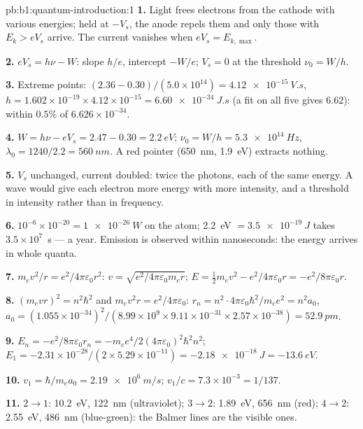 \begin{solution}{pb:b1:quantum-introduction:1}
\textbf{1.} Light frees electrons from the cathode with various
energies; held at $-V_s$, the anode repels them and only those with
$E_k > eV_s$ arrive. The current vanishes when $eV_s = E_{k,\max}$.

\textbf{2.} $eV_s = h\nu - W$: slope $h/e$, intercept $-W/e$; $V_s = 0$ at
the threshold $\nu_0 = W/h$.

\textbf{3.} Extreme points: $(2.36 - 0.30)/(5.0 \times 10^{14}) = \qty{4.12e-15}{V.s}$,
$h = 1.602 \times 10^{-19} \times 4.12 \times 10^{-15} = \qty{6.60e-34}{J.s}$ (a fit on
all five gives $6.62$): within $0.5\%$ of $6.626 \times 10^{-34}$.

\textbf{4.} $W = h\nu - eV_s = 2.47 - 0.30 = \qty{2.2}{eV}$; $\nu_0 = W/h =
\qty{5.3e14}{Hz}$, $\lambda_0 = 1240/2.2 = \qty{560}{nm}$. A red pointer
(\qty{650}{nm}, \qty{1.9}{eV}) extracts nothing.

\textbf{5.} $V_s$ unchanged, current doubled: twice the photons, each of
the same energy. A wave would give each electron more energy with more
intensity, and a threshold in intensity rather than in frequency.

\textbf{6.} $10^{-6} \times 10^{-20} = \qty{1e-26}{W}$ on the atom; \qty{2.2}{eV} $=
\qty{3.5e-19}{J}$ takes $3.5 \times 10^7$~s --- a year. Emission is observed
within nanoseconds: the energy arrives in whole quanta.

\textbf{7.} $m_ev^2/r = e^2/4\pi\varepsilon_0r^2$: $v = \sqrt{e^2/4\pi\varepsilon_0m_er}$; $E =
\tfrac12m_ev^2 - e^2/4\pi\varepsilon_0r = -e^2/8\pi\varepsilon_0r$.

\textbf{8.} $(m_evr)^2 = n^2\hbar^2$ and $m_ev^2r = e^2/4\pi\varepsilon_0$: $r_n = n^2 \cdot
4\pi\varepsilon_0\hbar^2/m_ee^2 = n^2a_0$, $a_0 = (1.055 \times 10^{-34})^2/(8.99 \times 10^9
\times 9.11 \times 10^{-31} \times 2.57 \times 10^{-38}) = \qty{52.9}{pm}$.

\textbf{9.} $E_n = -e^2/8\pi\varepsilon_0r_n = -m_ee^4/2(4\pi\varepsilon_0)^2\hbar^2n^2$; $E_1 =
-2.31 \times 10^{-28}/(2 \times 5.29 \times 10^{-11}) = \qty{-2.18e-18}{J} = \qty{-13.6}{eV}$.

\textbf{10.} $v_1 = \hbar/m_ea_0 = \qty{2.19e6}{m/s}$; $v_1/c = 7.3 \times 10^{-3} =
1/137$.

\textbf{11.} $2 \to 1$: \qty{10.2}{eV}, \qty{122}{nm} (ultraviolet); $3 \to 2$:
\qty{1.89}{eV}, \qty{656}{nm} (red); $4 \to 2$: \qty{2.55}{eV}, \qty{486}{nm}
(blue-green): the Balmer lines are the visible ones.


\end{solution}
